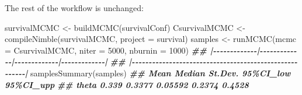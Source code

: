 \documentclass[
  12pt,
]{krantz}
\newenvironment{Shaded}{\begin{snugshade}}{\end{snugshade}}
\newcommand{\AttributeTok}[1]{\textcolor[rgb]{0.77,0.63,0.00}{#1}}
\newcommand{\CommentTok}[1]{\textcolor[rgb]{0.56,0.35,0.01}{\textit{#1}}}
\newcommand{\DecValTok}[1]{\textcolor[rgb]{0.00,0.00,0.81}{#1}}
\newcommand{\DocumentationTok}[1]{\textcolor[rgb]{0.56,0.35,0.01}{\textbf{\textit{#1}}}}
\newcommand{\FloatTok}[1]{\textcolor[rgb]{0.00,0.00,0.81}{#1}}
\newcommand{\FunctionTok}[1]{\textcolor[rgb]{0.00,0.00,0.00}{#1}}
\newcommand{\NormalTok}[1]{#1}
\newcommand{\OtherTok}[1]{\textcolor[rgb]{0.56,0.35,0.01}{#1}}
\newcommand{\SpecialCharTok}[1]{\textcolor[rgb]{0.00,0.00,0.00}{#1}}
\newcommand{\StringTok}[1]{\textcolor[rgb]{0.31,0.60,0.02}{#1}}
\begin{document}
\begin{Shaded}
\end{Shaded}

The rest of the workflow is unchanged:

\begin{Shaded}
\begin{Highlighting}[]
\NormalTok{survivalMCMC }\OtherTok{\textless{}{-}} \FunctionTok{buildMCMC}\NormalTok{(survivalConf)}
\NormalTok{CsurvivalMCMC }\OtherTok{\textless{}{-}} \FunctionTok{compileNimble}\NormalTok{(survivalMCMC, }
                               \AttributeTok{project =}\NormalTok{ survival)}
\NormalTok{samples }\OtherTok{\textless{}{-}} \FunctionTok{runMCMC}\NormalTok{(}\AttributeTok{mcmc =}\NormalTok{ CsurvivalMCMC, }
                   \AttributeTok{niter =} \DecValTok{5000}\NormalTok{, }
                   \AttributeTok{nburnin =} \DecValTok{1000}\NormalTok{)}
\DocumentationTok{\#\# |{-}{-}{-}{-}{-}{-}{-}{-}{-}{-}{-}{-}{-}|{-}{-}{-}{-}{-}{-}{-}{-}{-}{-}{-}{-}{-}|{-}{-}{-}{-}{-}{-}{-}{-}{-}{-}{-}{-}{-}|{-}{-}{-}{-}{-}{-}{-}{-}{-}{-}{-}{-}{-}|}
\DocumentationTok{\#\# |{-}{-}{-}{-}{-}{-}{-}{-}{-}{-}{-}{-}{-}{-}{-}{-}{-}{-}{-}{-}{-}{-}{-}{-}{-}{-}{-}{-}{-}{-}{-}{-}{-}{-}{-}{-}{-}{-}{-}{-}{-}{-}{-}{-}{-}{-}{-}{-}{-}{-}{-}{-}{-}{-}{-}|}
\FunctionTok{samplesSummary}\NormalTok{(samples)}
\DocumentationTok{\#\#        Mean Median St.Dev. 95\%CI\_low 95\%CI\_upp}
\DocumentationTok{\#\# theta 0.339 0.3377 0.05592    0.2374    0.4528}
\end{Highlighting}
\end{Shaded}
\end{document}
